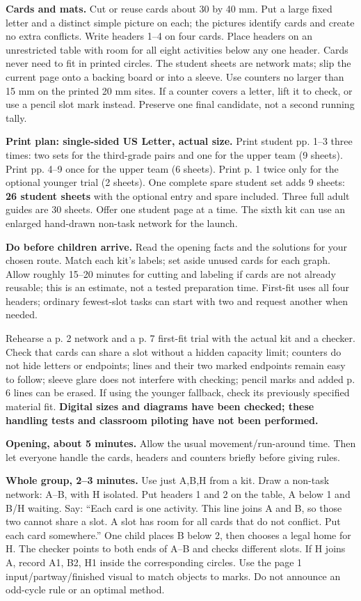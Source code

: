 \documentclass[10pt,letterpaper]{article}
\newcommand{\topic}[1]{\vspace{3pt}{\large\bfseries #1}\par}
\newcommand{\labelled}[2]{\textbf{#1} #2\par}
\begin{document}
\labelled{Cards and mats.}{Cut or reuse cards about 30 by 40 mm. Put a large fixed letter and a distinct simple picture on each; the pictures identify cards and create no extra conflicts. Write headers 1--4 on four cards. Place headers on an unrestricted table with room for all eight activities below any one header. Cards never need to fit in printed circles. The student sheets are network mats; slip the current page onto a backing board or into a sleeve. Use counters no larger than 15 mm on the printed 20 mm sites. If a counter covers a letter, lift it to check, or use a pencil slot mark instead. Preserve one final candidate, not a second running tally.}
\labelled{Print plan: single-sided US Letter, actual size.}{Print student pp. 1--3 three times: two sets for the third-grade pairs and one for the upper team (9 sheets). Print pp. 4--9 once for the upper team (6 sheets). Print p. 1 twice only for the optional younger trial (2 sheets). One complete spare student set adds 9 sheets: \textbf{26 student sheets} with the optional entry and spare included. Three full adult guides are 30 sheets. Offer one student page at a time. The sixth kit can use an enlarged hand-drawn non-task network for the launch.}
\labelled{Do before children arrive.}{Read the opening facts and the solutions for your chosen route. Match each kit's labels; set aside unused cards for each graph. Allow roughly 15--20 minutes for cutting and labeling if cards are not already reusable; this is an estimate, not a tested preparation time. First-fit uses all four headers; ordinary fewest-slot tasks can start with two and request another when needed.}
\topic{Physical pretest still to perform}
Rehearse a p. 2 network and a p. 7 first-fit trial with the actual kit and a checker. Check that cards can share a slot without a hidden capacity limit; counters do not hide letters or endpoints; lines and their two marked endpoints remain easy to follow; sleeve glare does not interfere with checking; pencil marks and added p. 6 lines can be erased. If using the younger fallback, check its previously specified material fit. \textbf{Digital sizes and diagrams have been checked; these handling tests and classroom piloting have not been performed.}
\newpage
\topic{A common launch, then choices at fixed tables}
\labelled{Opening, about 5 minutes.}{Allow the usual movement/run-around time. Then let everyone handle the cards, headers and counters briefly before giving rules.}
\labelled{Whole group, 2--3 minutes.}{Use just A,B,H from a kit. Draw a non-task network: A--B, with H isolated. Put headers 1 and 2 on the table, A below 1 and B/H waiting. Say: ``Each card is one activity. This line joins A and B, so those two cannot share a slot. A slot has room for all cards that do not conflict. Put each card somewhere.'' One child places B below 2, then chooses a legal home for H. The checker points to both ends of A--B and checks different slots. If H joins A, record A1, B2, H1 inside the corresponding circles. Use the page 1 input/partway/finished visual to match objects to marks. Do not announce an odd-cycle rule or an optimal method.}
\end{document}
